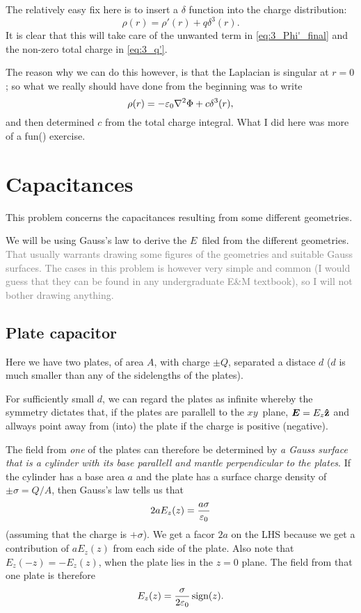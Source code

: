 \documentclass[11pt,letter, swedish, english
]{article}
\newcommand{\enaught}{\ensuremath\varepsilon_0}
\newcommand{\sign}{\ensuremath{\,\text{sign}}}
\begin{document}
The relatively easy fix here is to insert a $\delta$ function into the
charge distribution:
\begin{equation}
\rho(r)=\rho'(r)+q\delta^3(r).
\end{equation}
It is clear that this will take care of the unwanted term in
\eqref{eq:3_Phi'_final} and the non-zero total charge in
\eqref{eq:3_q'}. 

The reason why we can do this however, is that the Laplacian is
singular at $r=0$; so what we really should have done from the
beginning was to write 
\begin{equation}
\rho(r)=-\enaught\laplacian\Phi+c\delta^3(r),
\end{equation}
and then determined $c$ from the total charge integral. What I did
here was more of a fun(\textinterrobang) exercise.


\section{Capacitances}
This problem concerns the capacitances resulting from some different
geometries. 

We will be using Gauss's law to derive the $E$~filed from the
different geometries. 
\textcolor{gray}{
That usually warrants drawing some figures of
the geometries and suitable Gauss surfaces. The cases in this problem
is however very simple and common (I would guess that they can be
found in any undergraduate E\&M textbook), so I will not bother
drawing anything.
}

\subsection{Plate capacitor}
Here we have two plates, of area $A$, with charge $\pm Q$, separated a
distace $d$ ($d$ is much smaller than any of the sidelengths of the
plates). 

For sufficiently small $d$, we can regard the plates as infinite
whereby the symmetry dictates that, if the plates are parallell to the
$xy$~plane, $\vb*E=E_z\vu{z}$ and allways point away from (into) the
plate if the charge is positive (negative). 

The field from \emph{one} of the plates can therefore be determined by 
\textit{a Gauss surface that is a cylinder with its base parallell and
  mantle perpendicular to the plates}. If the cylinder has a base area
$a$ and the plate has a surface charge density of $\pm\sigma=Q/A$,
then Gauss's law tells us that
\begin{equation}
2a E_z(z)=\frac{a\sigma}{\enaught}
\end{equation}
(assuming that the charge is $+\sigma$).
We get a facor $2a$ on the LHS because we get a contribution of $aE_z(z)$
from each side of the plate. Also note that $E_z(-z)=-E_z(z)$, when
the plate lies in the $z=0$ plane. The field from that one plate is
therefore
\begin{equation}
E_z(z)=\frac{\sigma}{2\enaught}\sign(z).
\end{equation}
\end{document}
